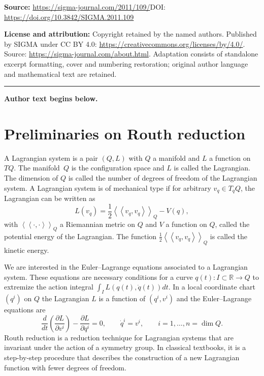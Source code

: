 \documentclass[11pt]{article}
\renewcommand{\ll}{\left<\!\left<}
\renewcommand{\gg}{\right>\!\right>}
\newcommand{\R}{\mathbb{R}}
\def\fpd#1#2{\frac{\partial #1}{\partial #2}}
\begin{document}
\noindent\textbf{Source:} \url{https://sigma-journal.com/2011/109/}\quad DOI: \url{https://doi.org/10.3842/SIGMA.2011.109}\par
\noindent\textbf{License and attribution:} Copyright retained by the named authors. Published by SIGMA under CC BY 4.0: \url{https://creativecommons.org/licenses/by/4.0/}. Source: \url{https://sigma-journal.com/about.html}. Adaptation consists of standalone excerpt formatting, cover and numbering restoration; original author language and mathematical text are retained.\par
\medskip\hrule\medskip\noindent\textbf{Author text begins below.}\par
\setcounter{section}{1}
\setcounter{subsection}{0}
\setcounter{subsubsection}{0}
\setcounter{equation}{0}
\section{Preliminaries on Routh reduction}\label{section2}

\begin{definition} A Lagrangian system is a pair $(Q,L)$ with $Q$ a manifold and $L$ a function on~$TQ$. The manifold~$Q$ is the conf\/iguration space and $L$ is called the Lagrangian. The dimension of $Q$ is called the number of degrees of freedom of the Lagrangian system.  A Lagrangian system is of mechanical type if for arbitrary $v_q\in T_qQ$, the Lagrangian can be written as \[L(v_q) = \frac12 \ll v_q,v_q\gg_Q-V(q),\] with $\ll\cdot,\cdot\gg_Q$ a Riemannian metric on $Q$ and $V$ a function on $Q$, called the potential energy of the Lagrangian. The function $\frac12\ll v_q,v_q\gg_Q$ is called the kinetic energy.
\end{definition}

We are interested in the Euler--Lagrange equations associated to a Lagrangian system. These equations are necessary conditions for a curve $q(t):I\subset \R \to Q$ to extremize the action integral $\int_I L(q(t), \dot q(t)) dt$. In a local coordinate chart $(q^i)$  on $Q$ the Lagrangian $L$ is a function of $(q^i,v^i)$ and the Euler--Lagrange equations are
\[
\frac{d}{dt} \left(\fpd{L}{v^i} \right) - \fpd{L}{q^i} = 0, \qquad \dot q^i =v^i, \qquad i=1,\ldots, n=\dim Q.
\]
Routh reduction is a reduction technique for Lagrangian systems that are invariant under the action of a symmetry group. In classical textbooks, it is a step-by-step procedure that describes the construction of a new Lagrangian function with fewer degrees of freedom.
\end{document}
